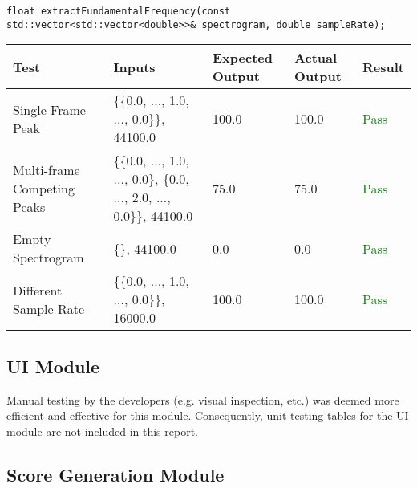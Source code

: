 \documentclass[12pt, titlepage]{article}
\begin{document}
\noindent\texttt{float extractFundamentalFrequency(const std::vector<std::vector<double>>\& spectrogram, double sampleRate);}

\begin{longtable}{|L{3cm}|L{2cm}|L{2cm}|L{2cm}|l|}
  \hline
  \textbf{Test} & \textbf{Inputs} & \textbf{Expected Output} & \textbf{Actual Output} & \textbf{Result} \\
  \hline
  Single Frame Peak & \{\{0.0, ..., 1.0, ..., 0.0\}\}, 44100.0 & 100.0 & 100.0 & \textcolor{green}{Pass} \\
  \hline
  Multi-frame Competing Peaks & \{\{0.0, ..., 1.0, ..., 0.0\}, \{0.0, ..., 2.0, ..., 0.0\}\}, 44100.0 & 75.0 & 75.0 & \textcolor{green}{Pass} \\
  \hline
  Empty Spectrogram & \{\}, 44100.0 & 0.0 & 0.0 & \textcolor{green}{Pass} \\
  \hline
  Different Sample Rate & \{\{0.0, ..., 1.0, ..., 0.0\}\}, 16000.0 & 100.0 & 100.0 & \textcolor{green}{Pass} \\
  \hline
\end{longtable}

\subsection{UI Module}
Manual testing by the developers (e.g. visual inspection, etc.) was deemed more efficient and effective for this module. Consequently, unit testing tables for the UI 
module are not included in this report.\\

\subsection{Score Generation Module}
\end{document}
